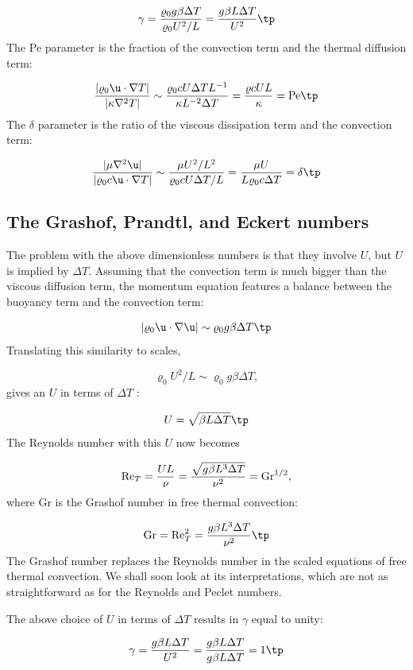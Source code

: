 \documentclass[graybox,envcountchap,sectrefs,final]{svmonodo}
\begin{document}
\[ \gamma = \frac{\varrho_0 g\beta \Delta T }{\varrho_0 U^2/L}
= \frac{g\beta L\Delta T }{U^2}\tp\]
The Pe parameter is the fraction of the convection term
and the thermal diffusion term:

\[ \frac{|\varrho_0\u\cdot\nabla T|}{|\kappa\nabla^2 T|}\sim
\frac{\varrho_0 c U \Delta T L^{-1}}{\kappa L^{-2}\Delta T}
= \frac{\varrho c UL}{\kappa } = \hbox{Pe}\tp\]
The $\delta$ parameter is the ratio of the viscous dissipation term
and the convection term:

\[ \frac{|\mu\nabla^2\u|}{|\varrho_0c\u\cdot\nabla T|}\sim
\frac{\mu U^2/L^2}{\varrho_0 c U \Delta T/L} =
\frac{\mu U}{L\varrho_0 c \Delta T} = \delta\tp
\]

\subsection{The Grashof, Prandtl, and Eckert numbers}


The problem with the above dimensionless numbers is that they involve
$U$, but $U$ is implied by $\Delta T$. Assuming that the convection
term is much bigger than the viscous diffusion term, the momentum
equation features a balance between the buoyancy term and the convection
term:

\[ |\varrho_0 \u\cdot\nabla\u| \sim \varrho_0 g \beta\Delta T\tp\]
Translating this similarity to scales,

\[ \varrho_0 U^2/L \sim \varrho_0 g \beta\Delta T,\]
gives an $U$ in terms of $\Delta T$ :

\[ U = \sqrt{\beta L \Delta T}\tp\]
The Reynolds number with this $U$ now becomes

\[ \hbox{Re}_T = \frac{UL}{\nu} = \frac{\sqrt{g\beta L^3 \Delta T}}{\nu^2}
= \hbox{Gr}^{1/2},\]
where Gr is the Grashof number in free thermal convection:

\[ \hbox{Gr} = \hbox{Re}_T^2 =  \frac{g\beta L^3 \Delta T}{\nu^2}\tp\]
The Grashof number replaces the Reynolds number in the scaled equations
of free thermal convection. We shall soon look at its interpretations,
which are not as straightforward as for the Reynolds and Peclet numbers.

The above
choice of $U$ in terms of $\Delta T$ results in $\gamma$ equal to unity:

\[ \gamma = \frac{g\beta L\Delta T }{U^2} =
\frac{g\beta L\Delta T }{g\beta L \Delta T} = 1\tp\]

\end{document}
